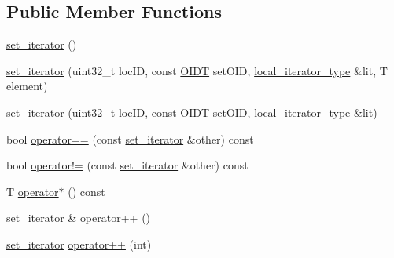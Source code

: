 \subsection*{Public Member Functions}
\begin{DoxyCompactItemize}
\item 
\hyperlink{classshad_1_1set__iterator_aaa748b984ba1889894b642048b4a0e19}{set\-\_\-iterator} ()
\item 
\hyperlink{classshad_1_1set__iterator_a48b9c19f645efb3625b552abd0970b13}{set\-\_\-iterator} (uint32\-\_\-t loc\-I\-D, const \hyperlink{classshad_1_1set__iterator_a2da49754284fd7ddf591c2df4123b57d}{O\-I\-D\-T} set\-O\-I\-D, \hyperlink{classshad_1_1set__iterator_a162b1b9d8dfe2e3a656fcdacf0450939}{local\-\_\-iterator\-\_\-type} \&lit, T element)
\item 
\hyperlink{classshad_1_1set__iterator_ac177dfe74c98af3943757273e499c8d5}{set\-\_\-iterator} (uint32\-\_\-t loc\-I\-D, const \hyperlink{classshad_1_1set__iterator_a2da49754284fd7ddf591c2df4123b57d}{O\-I\-D\-T} set\-O\-I\-D, \hyperlink{classshad_1_1set__iterator_a162b1b9d8dfe2e3a656fcdacf0450939}{local\-\_\-iterator\-\_\-type} \&lit)
\item 
bool \hyperlink{classshad_1_1set__iterator_af863b5f03ab32a49c8007e354a33cd38}{operator==} (const \hyperlink{classshad_1_1set__iterator}{set\-\_\-iterator} \&other) const 
\item 
bool \hyperlink{classshad_1_1set__iterator_ad31484cf73b92999b9d1b2979eef8046}{operator!=} (const \hyperlink{classshad_1_1set__iterator}{set\-\_\-iterator} \&other) const 
\item 
T \hyperlink{classshad_1_1set__iterator_a3ae23533d7aa28c234d61e7626f9e635}{operator$\ast$} () const 
\item 
\hyperlink{classshad_1_1set__iterator}{set\-\_\-iterator} \& \hyperlink{classshad_1_1set__iterator_ab1dc70400a6aac2e3fb89f0cbb7dee57}{operator++} ()
\item 
\hyperlink{classshad_1_1set__iterator}{set\-\_\-iterator} \hyperlink{classshad_1_1set__iterator_ad87b4d58f5c5febdc8ac4075df1b9781}{operator++} (int)
\end{DoxyCompactItemize}
